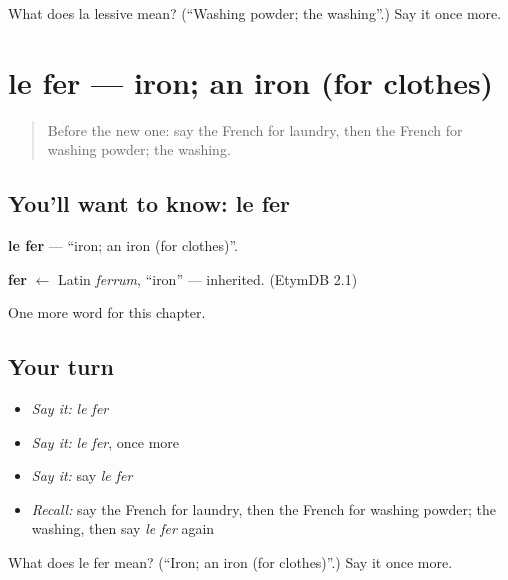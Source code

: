 \begin{tcolorbox}[breakable,colback=teal!4,colframe=teal!35!black,title={Before you move on}]
What does la lessive mean? (\textquotedblleft{}Washing powder; the washing\textquotedblright{}.) Say it once more.
\end{tcolorbox}
\section[le fer]{le fer — iron; an iron (for clothes)}

\label{lesson:FR-C115-fer}



\begin{quote}
Before the new one: say the French for laundry, then the French for washing powder; the washing.
\end{quote}

\subsection*{You'll want to know: le fer}
\textbf{le fer} — \textquotedblleft{}iron; an iron (for clothes)\textquotedblright{}.

\begin{cousinweb}
\textbf{fer} $\leftarrow$ Latin \emph{ferrum}, \textquotedblleft{}iron\textquotedblright{} — inherited. (EtymDB 2.1)
\end{cousinweb}

\begin{grammarlens}[title={What you've built}]
One more word for this chapter.
\end{grammarlens}

\subsection*{Your turn}
\begin{itemize}
\raggedright
  \item \emph{Say it:} \emph{le fer}
  \item \emph{Say it:} \emph{le fer}, once more
  \item \emph{Say it:} say \emph{le fer}
  \item \emph{Recall:} say the French for laundry, then the French for washing powder; the washing, then say \emph{le fer} again
\end{itemize}

\begin{tcolorbox}[breakable,colback=teal!4,colframe=teal!35!black,title={Before you move on}]
What does le fer mean? (\textquotedblleft{}Iron; an iron (for clothes)\textquotedblright{}.) Say it once more.
\end{tcolorbox}
